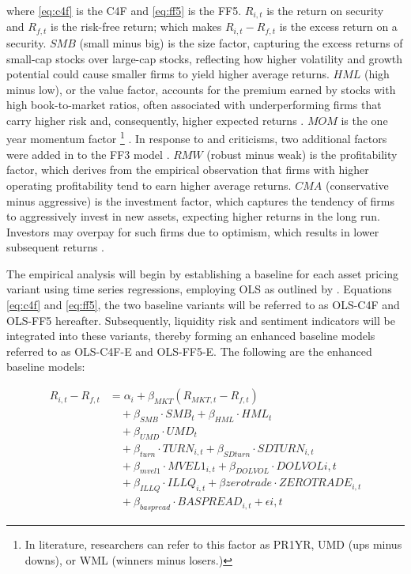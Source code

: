 where \cref{eq:c4f} is the C4F and \cref{eq:ff5} is the FF5. $R_{i,t}$ is the return on security and $R_{f,t}$ is the risk-free return; which makes $R_{i,t} - R_{f,t}$ is the excess return on a security. $SMB$ (small minus big) is the size factor, capturing the excess returns of small-cap stocks over large-cap stocks, reflecting how higher volatility and growth potential could cause smaller firms to yield higher average returns. $HML$ (high minus low), or the value factor, accounts for the premium earned by stocks with high book-to-market ratios, often associated with underperforming firms that carry higher risk and, consequently, higher expected returns \cite{ff3_1993}. $MOM$ is the one year momentum factor \footnote{In literature, researchers can refer to this factor as PR1YR, UMD (ups minus downs), or WML (winners minus losers.)} \cite{cahart_1997}. In response to  and  criticisms, two additional factors were added in to the FF3 model \cite{ff5_2015}. $RMW$ (robust minus weak) is the profitability factor, which derives from the empirical observation that firms with higher operating profitability tend to earn higher average returns. $CMA$ (conservative minus aggressive) is the investment factor, which captures the tendency of firms to aggressively invest in new assets, expecting higher returns in the long run. Investors may overpay for such firms due to optimism, which results in lower subsequent returns \cite{titman_2004}.

The empirical analysis will begin by establishing a baseline for each asset pricing variant using time series regressions, employing OLS as outlined by . Equations \ref{eq:c4f} and \ref{eq:ff5}, the two baseline variants will be referred to as OLS-C4F and OLS-FF5 hereafter. Subsequently, liquidity risk and sentiment indicators will be integrated into these variants, thereby forming an enhanced baseline models referred to as OLS-C4F-E and OLS-FF5-E. The following are the enhanced baseline models:

\begin{equation}
    \label{eq:c4f_expanded}
    \begin{split}
    R_{i,t} - R_{f,t} &= \alpha_i + \beta_{MKT} (R_{MKT,t} - R_{f,t}) \\
    &\quad + \beta_{SMB} \cdot SMB_t + \beta_{HML} \cdot HML_t \\
    &\quad + \beta_{UMD} \cdot UMD_t \\
    &\quad + \beta_{turn} \cdot TURN_{i,t} + \beta_{SDturn} \cdot SDTURN_{i,t} \\
    &\quad + \beta_{mvel1} \cdot MVEL1_{i,t} + \beta_{DOLVOL} \cdot DOLVOL{i,t} \\
    &\quad + \beta_{ILLQ} \cdot ILLQ_{i,t} + \beta{zerotrade} \cdot ZEROTRADE_{i,t} \\
    &\quad + \beta_{baspread} \cdot BASPREAD_{i,t} + \epsilon{i,t}
    \end{split}
\end{equation}

